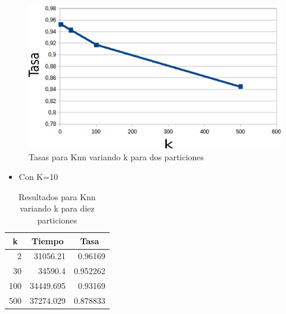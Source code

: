     \begin{figure}[H]
    \centering
    \includegraphics[scale=0.3]{Graficos/knnTasa2.png}
    \caption{Tasas para Knn variando k para dos particiones}
	\label{knnTasa2}
    \end{figure}
\bigskip
\bigskip
\bigskip






\begin{itemize}
\item Con K=10\\
\end{itemize}

\begin{center}

\begin{table}[H]
\centering
\begin{tabular}{|r|r|r|}
\hline
\multicolumn{1}{|c|}{k} & \multicolumn{1}{c|}{Tiempo} & \multicolumn{1}{c|}{Tasa} \\ \hline
2 & 31056.21 & 0.96169 \\ \hline
30 & 34590.4  & 0.952262 \\ \hline
100 & 34449.695 & 0.93169 \\ \hline
500 & 37274.029 & 0.878833 \\ \hline
\end{tabular}
\caption{Resultados para Knn variando k para diez particiones}
\label{}
\end{table}
\end{center}

\bigskip
\bigskip
\bigskip

